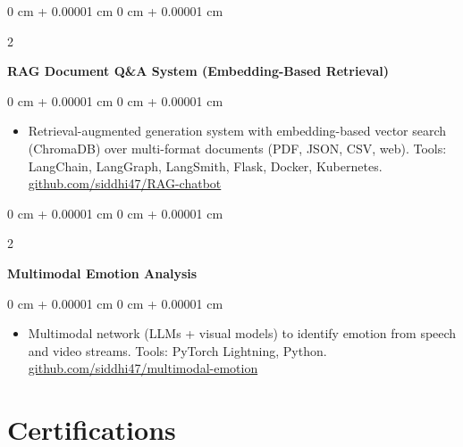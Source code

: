 \documentclass[10pt, letterpaper]{article}
\newenvironment{highlights}{
    \begin{itemize}[
        topsep=0.04 cm,
        parsep=0.04 cm,
        partopsep=0pt,
        itemsep=0pt,
        leftmargin=0 cm + 10pt
    ]
}{
    \end{itemize}
} %
\newenvironment{onecolentry}{
    \begin{adjustwidth}{
        0 cm + 0.00001 cm
    }{
        0 cm + 0.00001 cm
    }
}{
    \end{adjustwidth}
} %
\newenvironment{twocolentry}[2][]{
    \onecolentry
    \def\secondColumn{#2}
    \setcolumnwidth{\fill, 4.5 cm}
    \begin{paracol}{2}
}{
    \switchcolumn \raggedleft \secondColumn
    \end{paracol}
    \endonecolentry
} %
\begin{document}
        \vspace{0.1 cm}

        \begin{twocolentry}{
        }
            \textbf{RAG Document Q\&A System (Embedding-Based Retrieval)}\end{twocolentry}

        \vspace{0.06 cm}
        \begin{onecolentry}
            \begin{highlights}
                \item Retrieval-augmented generation system with embedding-based vector search (ChromaDB) over multi-format documents (PDF, JSON, CSV, web). Tools: LangChain, LangGraph, LangSmith, Flask, Docker, Kubernetes. \href{https://github.com/siddhi47/RAG-chatbot}{github.com/siddhi47/RAG-chatbot}
            \end{highlights}
        \end{onecolentry}

        \vspace{0.1 cm}

        \begin{twocolentry}{
           
        }
            \textbf{Multimodal Emotion Analysis}\end{twocolentry}

        \vspace{0.06 cm}
        \begin{onecolentry}
            \begin{highlights}
                \item Multimodal network (LLMs + visual models) to identify emotion from speech and video streams. Tools: PyTorch Lightning, Python. \href{https://github.com/siddhi47/multimodal-emotion}{github.com/siddhi47/multimodal-emotion}
            \end{highlights}
        \end{onecolentry}


    \section{Certifications}
        
\end{document}
